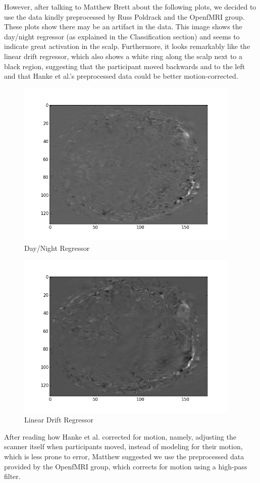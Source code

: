 \documentclass[11pt]{article}
\begin{document}
However, after talking to Matthew Brett about the following plots, 
we decided to use the data kindly preprocessed by Russ Poldrack and the OpenfMRI
group.  These plots show there may be an artifact in the data.  This image shows
the day/night regressor (as explained in the Classification section) and seems
to indicate great activation in the scalp.  Furthermore, it looks remarkably like the linear drift regressor, which also shows a white ring along the scalp
next to a black region, suggesting that the participant moved backwards and to
the left and that Hanke et al.'s preprocessed data could be better motion-corrected.
\begin{figure}[H]                                                               
\caption{Day/Night Regressor}                                                   
\centering                                                                      
\includegraphics[height=8cm]{day_night_artifact.png}                            
\end{figure}   

\begin{figure}[H]                                                               
\caption{Linear Drift Regressor}                                                   
\centering                                                                      
\includegraphics[height=8cm]{linear_drift_artifact.png}                            
\end{figure}  
After reading how Hanke et al. corrected for motion, namely, adjusting the 
scanner itself when participants moved, instead of modeling for their motion, 
which is less prone to error, Matthew suggested we use the preprocessed data
provided by the OpenfMRI group, 
which corrects for motion using a high-pass filter.
   
\end{document}
